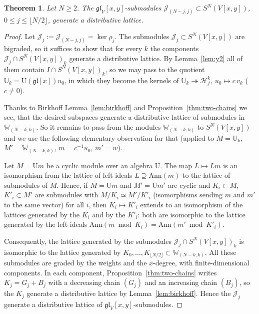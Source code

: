 \documentclass[11pt]{amsart}
\numberwithin{equation}{section}
\newtheorem{theorem}[equation]{Theorem}
\theoremstyle{definition}
\newcommand{\gl}{\mathfrak{gl}}
\newcommand{\U}{\mathrm{U}}
\newcommand{\bW}{\mathbb{W}}          %
\newcommand{\bU}{\mathbb{U}}
\newcommand{\Ann}{\mathrm{Ann}}
\newcommand{\cJ}{\mathcal{J}}
\begin{document}
	\begin{theorem}\label{thm:lattice-gl}
		Let $N\ge2$. The $\gl_V[x,y]$-submodules $\cJ_{(N-j,j)}\subset S^N(V[x,y])$, $0\le j\le\lfloor N/2\rfloor$, generate a distributive lattice.
	\end{theorem}	
	\begin{proof}
		Let $\cJ_j:=\cJ_{(N-j,j)}=\ker\rho_j$. The submodules $\cJ_j\subset S^N(V[x,y])$ are bigraded, so it suffices to show that for every $k$ the components $\cJ_j\cap S^N(V[x,y])_k$ generate a distributive lattice. By Lemma~\ref{lem:y2} all of them contain $I\cap S^N(V[x,y])_k$, so we may pass to the quotient $\bU_k=\U(\gl[x])u_0$, in which they become the kernels of $\bU_k\twoheadrightarrow\mathcal H_j^k$, $u_0\mapsto c\,v_k$ ($c\ne0$).
		
		Thanks to Birkhoff Lemma~\ref{lem:birkhoff} and Proposition~\ref{thm:two-chains} we see, that the desired subspaces generate a distributive lattice of submodules in $\bW_{(N-k,k)}$. So it remains to  pass from the modules $\bW_{(N-k,k)}$ to $S^N(V[x,y])$ and we use the following elementary observation for that (applied to $M=\bU_k$, $M'=\bW_{(N-k,k)}$, $m=c^{-1}u_0$, $m'=w$).
		
		Let $M=\U m$ be a cyclic module over an algebra $\U$. The map $L\mapsto Lm$ is an isomorphism from the lattice of left ideals $L\supseteq\Ann(m)$ to the lattice of submodules of $M$. Hence, if $M=\U m$ and $M'=\U m'$ are cyclic and $K_i\subset M$, $K'_i\subset M'$ are submodules with $M/K_i\simeq M'/K'_i$ (isomorphisms sending $m$ and $m'$ to the same vector) for all $i$, then $K_i\mapsto K'_i$ extends to an isomorphism of the lattices generated by the $K_i$ and by the $K'_i$: both are isomorphic to the lattice generated by the left ideals $\Ann(m\bmod K_i)=\Ann(m'\bmod K'_i)$.
		
		Consequently, the lattice generated by the submodules $\cJ_j\cap S^N(V[x,y])_k$ is isomorphic to the lattice generated by $K_0,\dots,K_{\lfloor N/2\rfloor}\subset\bW_{(N-k,k)}$. All these submodules are graded by the weights and the $x$-degree, with finite-dimensional components. In each component, Proposition~\ref{thm:two-chains} writes $K_j=G_j+B_j$ with a decreasing chain $(G_j)$ and an increasing chain $(B_j)$, so the $K_j$ generate a distributive lattice by Lemma~\ref{lem:birkhoff}. Hence the $\cJ_j$ generate a distributive lattice of $\gl_V[x,y]$-submodules.
	\end{proof}
	
\end{document}

